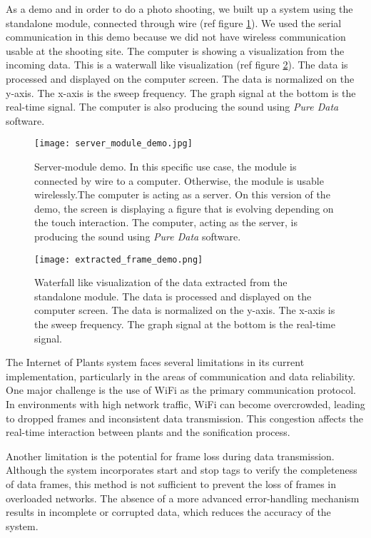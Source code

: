 As a demo and in order to do a photo shooting, we built up a system using the standalone module, connected through wire (ref figure \ref{fig:server_module_demo}). We used the serial communication in this demo because we did not have wireless communication usable at the shooting site. The computer is showing a visualization from the incoming data. This is a waterwall like visualization (ref figure \ref{fig:extracted_frame_demo}). The data is processed and displayed on the computer screen. The data is normalized on the y-axis. The x-axis is the sweep frequency. The graph signal at the bottom is the real-time signal. The computer is also producing the sound using \textit{Pure Data} software.

\begin{figure}[h!]
    \centering
    \texttt{[image: server\_module\_demo.jpg]}
    \caption{Server-module demo. In this specific use case, the module is connected by wire to a computer. Otherwise, the module is usable wirelessly.The computer is acting as a server. On this version of the demo, the screen is displaying a figure that is evolving depending on the touch interaction. The computer, acting as the server, is producing the sound using \textit{Pure Data} software.}
    \vspace{0.1cm}
    \label{fig:server_module_demo}
\end{figure}

\begin{figure}[h!]
    \centering
    \texttt{[image: extracted\_frame\_demo.png]}
    \caption{Waterfall like visualization of the data extracted from the standalone module. The data is processed and displayed on the computer screen. The data is normalized on the y-axis. The x-axis is the sweep frequency. The graph signal at the bottom is the real-time signal.}
    \vspace{0.1cm}
    \label{fig:extracted_frame_demo}
\end{figure}

The Internet of Plants system faces several limitations in its current implementation, particularly in the areas of communication and data reliability. One major challenge is the use of WiFi as the primary communication protocol. In environments with high network traffic, WiFi can become overcrowded, leading to dropped frames and inconsistent data transmission. This congestion affects the real-time interaction between plants and the sonification process.

Another limitation is the potential for frame loss during data transmission. Although the system incorporates start and stop tags to verify the completeness of data frames, this method is not sufficient to prevent the loss of frames in overloaded networks. The absence of a more advanced error-handling mechanism results in incomplete or corrupted data, which reduces the accuracy of the system.

